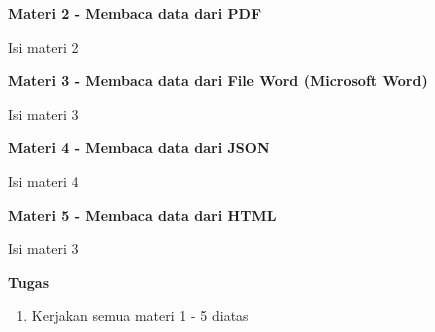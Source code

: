 \documentclass{article}
\begin{document}
    \begin{flushleft}
        \textbf{Materi 2 - Membaca data dari PDF}
        \newline

        Isi materi 2
    \end{flushleft}

    \begin{flushleft}
        \textbf{Materi 3 - Membaca data dari File Word (Microsoft Word)}
        \newline

        Isi materi 3
    \end{flushleft}

    \begin{flushleft}
        \textbf{Materi 4 - Membaca data dari JSON}
        \newline

        Isi materi 4
    \end{flushleft}

    \begin{flushleft}
        \textbf{Materi 5 - Membaca data dari HTML}
        \newline

        Isi materi 3
    \end{flushleft}

    \newpage
    \begin{flushleft}
        \textbf{Tugas}
        \newline

        \begin{enumerate}
            \item Kerjakan semua materi 1 - 5 diatas
        \end{enumerate}
    \end{flushleft}
\end{document}
